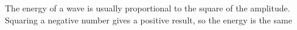 The energy of a wave is usually proportional to the square of the
amplitude. Squaring a negative number gives a positive result, so the
energy is the same
